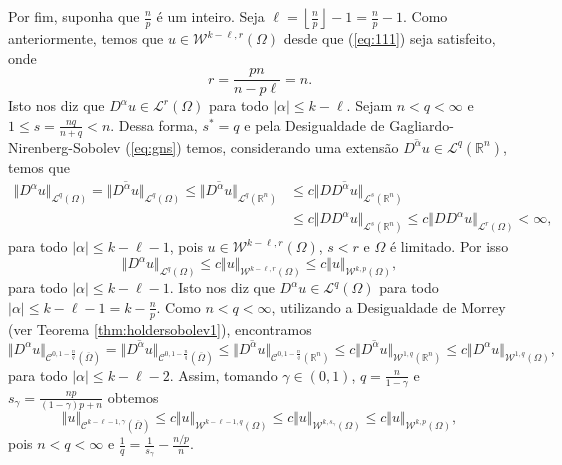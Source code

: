 \documentclass[a4paper, 11pt]{book}
\theoremstyle{definition}
\newcommand{\bR}{\mathbb{R}}
\newcommand{\cC}{\mathcal{C}}
\newcommand{\cL}{\mathcal{L}}
\newcommand{\cW}{\mathcal{W}}
\begin{document}
\begin{prf}
    Por fim, suponha que $\frac{n}{p}$ é um inteiro. Seja $\ell = \left\lfloor \frac{n}{p} \right\rfloor - 1 = \frac{n}{p} - 1$.
    Como anteriormente, temos que $u \in \cW^{k-\ell,r}(\Omega)$ desde que (\ref{eq:111}) seja satisfeito, onde
    \[
        r = \frac{pn}{n - p\ell} = n.
    \]
    Isto nos diz que $D^\alpha u \in \cL^r(\Omega)$ para todo $|\alpha| \leqslant k - \ell$.
    Sejam $n < q < \infty$ e $1 \leqslant s = \frac{nq}{n + q} < n$. Dessa forma, $s^* = q$ e pela Desigualdade de Gagliardo-Nirenberg-Sobolev (\ref{eq:gns}) temos, considerando uma extensão $\overline{D^\alpha u} \in \cL^q(\bR^n)$, temos que
    \[
        \begin{aligned}
            \Vert D^\alpha u \Vert_{\cL^q(\Omega)} = \Vert \overline{D^\alpha u}  \Vert_{\cL^q(\Omega)} \leqslant \Vert \overline{D^\alpha u} \Vert_{\cL^q(\bR^n)} &\leqslant c \Vert D \overline{D^\alpha u} \Vert_{\cL^s(\bR^n)}\\ &\leqslant c \Vert D D^\alpha u \Vert_{\cL^s(\bR^n)} \leqslant c\Vert D D^\alpha u \Vert_{\cL^r(\Omega)} < \infty,
        \end{aligned}
    \]
    para todo $|\alpha| \leqslant k - \ell - 1$, pois $u \in \cW^{k-\ell,r}(\Omega)$, $s < r$ e $\Omega$ é limitado. Por isso
    \[
        \Vert D^\alpha u \Vert_{\cL^q(\Omega)} \leqslant c \Vert u \Vert_{\cW^{k-\ell,r}(\Omega)} \leqslant c \Vert u \Vert_{\cW^{k,p}(\Omega)},
    \]
    para todo $|\alpha| \leqslant k - \ell - 1$. Isto nos diz que $D^\alpha u \in \cL^q(\Omega)$ para todo $|\alpha| \leqslant k - \ell - 1 = k - \frac{n}{p}$.
    Como $n < q < \infty$, utilizando a Desigualdade de Morrey (ver Teorema \ref{thm:holdersobolev1}), encontramos
    \[
        \Vert D^\alpha u \Vert_{\cC^{0,1-\frac{n}{q}}(\overline\Omega)} = \Vert \overline{D^\alpha u} \Vert_{\cC^{0,1-\frac{n}{q}}(\overline\Omega)} \leqslant \Vert \overline{D^\alpha u} \Vert_{\cC^{0,1 - \frac{n}{q}}(\bR^n)} \leqslant c \Vert \overline{D^\alpha u} \Vert_{\cW^{1,q}(\bR^n)} \leqslant c \Vert D^\alpha u \Vert_{\cW^{1,q}(\Omega)},
    \]
    para todo $|\alpha| \leqslant k - \ell - 2$.
    Assim, tomando $\gamma \in (0,1)$, $q = \frac{n}{1 - \gamma}$ e $s_\gamma = \frac{np}{(1- \gamma)p + n}$ obtemos
    \[
        \Vert u \Vert_{\cC^{k-\ell-1,\gamma}(\overline\Omega)} \leqslant c\Vert u \Vert_{\cW^{k-\ell-1,q}(\Omega)} \leqslant c \Vert u \Vert_{\cW^{k,s_\gamma}(\Omega)} \leqslant c \Vert u \Vert_{\cW^{k,p}(\Omega)},
    \]
    pois $n < q < \infty$ e $\frac{1}{q} = \frac{1}{s_\gamma} - \frac{n/p}{n}$.
\end{prf}
\end{document}
